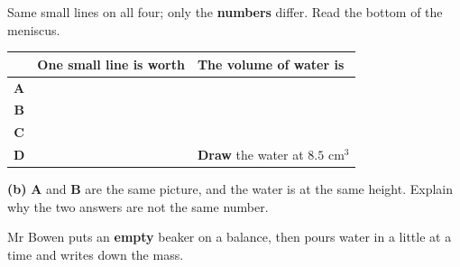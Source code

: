 \documentclass[12pt,a4paper]{article}
\newcommand{\qlines}[1]{\par\needspace{\numexpr#1+1\relax\baselineskip}\wlines{#1}}
\newcommand{\ccm}{\ensuremath{\mathrm{cm^3}}}
\newcommand{\cyl}[4]{%
  \begin{scope}[shift={(#1,0)}]
    \ifnum#4>0
      \fill[cbteal!22] (0.07,0.05) rectangle (1.53,#4);
      \draw[cbteal!80!black, line width=1.0pt]
        (0.07,#4) .. controls (0.55,{#4-0.6}) and (1.05,{#4-0.6}) .. (1.53,#4);
    \fi
    \draw[black!70] (0,21) -- (0,0) -- (1.6,0) -- (1.6,21);
    \draw[black!70] (-0.3,-1.1) -- (1.9,-1.1) -- (1.6,0) -- (0,0) -- cycle;
    \foreach \v in {1,...,20}{\draw[black!70, line width=0.7pt] (0,\v) -- (0.34,\v);}
    \foreach \v/\lab in {#3}{
      \draw[black!70, line width=1.0pt] (0,\v) -- (0.66,\v);
      \node[anchor=east, font=\scriptsize] at (-0.14,\v) {\lab};}
    \node[font=\bfseries] at (0.8,22.6) {#2};
  \end{scope}}
\begin{document}
\noindent Same small lines on all four; only the \textbf{numbers} differ. Read the
bottom of the meniscus.

\vspace{6pt}
\begin{center}
\end{center}

\vspace{4pt}
\noindent
\begin{tabularx}{\textwidth}{|c|L|L|}
  \hline
  & \textbf{One small line is worth} & \textbf{The volume of water is} \\
  \hline
  \textbf{A} \rule[-0.7em]{0pt}{2.1em} & & \\ \hline
  \textbf{B} \rule[-0.7em]{0pt}{2.1em} & & \\ \hline
  \textbf{C} \rule[-0.7em]{0pt}{2.1em} & & \\ \hline
  \textbf{D} \rule[-0.7em]{0pt}{2.1em} & &
    \textbf{Draw} the water at $8.5$ \ccm \\ \hline
\end{tabularx}

\vspace{8pt}
\noindent \textbf{(b)} \textbf{A} and \textbf{B} are the same picture, and the water is
at the same height. Explain why the two answers are not the same number.
\qlines{2}


\noindent Mr Bowen puts an \textbf{empty} beaker on a balance, then pours water in a
little at a time and writes down the mass.
\end{document}
